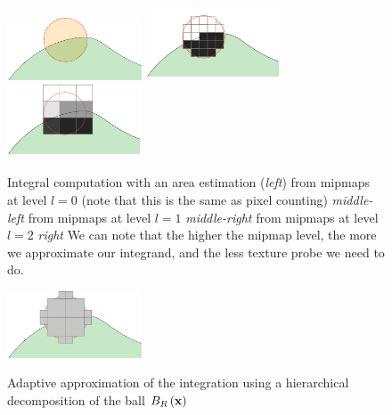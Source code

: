 \documentclass{llncs}
\begin{document}
\begin{figure}
  \vspace{-0.35cm}
  \begin{center}
    {\includegraphics[width=4.0cm]{figs/approx1}}
    {\includegraphics[width=4.0cm]{figs/approx-reg-1}}
    {\includegraphics[width=4.0cm]{figs/approx-reg-2}}
  \end{center}
  \vspace{-0.35cm}
  \caption{Integral computation with an area estimation (\emph{left}) 
  \color{blue}
  	from mipmaps at level $l=0$ (note that this is the same as pixel counting) \emph{middle-left}
  	from mipmaps at level $l=1$ \emph{middle-right}
  	from mipmaps at level $l=2$ \emph{right}
  	We can note that the higher the mipmap level, the more we approximate our integrand, and the less texture probe we need to do.
    \normalcolor}
  \label{fig:approx}
  \vspace{-0.35cm}
\end{figure}

\begin{figure}
  \vspace{-0.35cm}
  \begin{center}
    {\includegraphics[width=4cm]{figs/approx-bh}}
  \end{center}
  \vspace{-0.35cm}
  \caption{Adaptive approximation of the integration using a
    hierarchical decomposition of the ball $B_{R}\left(\mathbf{x}\right)$ }
  \label{fig:approx2}
  \vspace{-0.35cm}
\end{figure}
\end{document}
